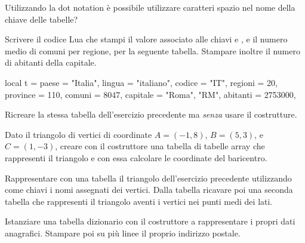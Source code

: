 \begin{Exercise}[label={tab-02}]
Utilizzando la dot notation è possibile utilizzare caratteri spazio nel nome
della chiave delle tabelle?
\end{Exercise}

\begin{Exercise}[label={tab-03}]
Scrivere il codice Lua che stampi il valore associato alle chiavi  e
, e il numero medio di comuni per regione, per la seguente tabella.
Stampare inoltre il numero di abitanti della capitale.
\begin{lines}
local t = {
    paese = "Italia",
    lingua = "italiano",
    codice = "IT",
    regioni = 20,
    province = 110,
    comuni = 8047,
    capitale = {"Roma", "RM", abitanti = 2753000},
}
\end{lines}
\end{Exercise}

\begin{Exercise}[label={tab-04}]
Ricreare la stessa tabella  dell'esercizio precedente ma \emph{senza}
usare il costrutture.
\end{Exercise}

\begin{Exercise}[label={tab-05}]
Dato il triangolo di vertici di coordinate \( A = \left( -1, 8\right) \), \( B =
\left( 5, 3\right) \), e \( C = \left( 1, -3\right) \), creare con il
costruttore una tabella di tabelle array che rappresenti il triangolo e con essa
calcolare le coordinate del baricentro.
\end{Exercise}

\begin{Exercise}[label={tab-06}]
Rappresentare con una tabella il triangolo dell'esercizio precedente utilizzando
come chiavi i nomi assegnati dei vertici. Dalla tabella ricavare poi una seconda
tabella che rappresenti il triangolo aventi i vertici nei punti medi dei lati.
\end{Exercise}

\begin{Exercise}[label={tab-07}]
Istanziare una tabella dizionario con il costruttore a rappresentare i propri
dati anagrafici. Stampare poi su più linee il proprio indirizzo postale.
\end{Exercise}

